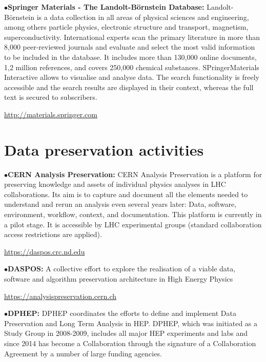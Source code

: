 \item{$\bullet$}{\bf Springer Materials  - The Landolt-B\"ornstein Database:}
Landolt-B\"ornstein is a data collection in all areas of physical sciences and engineering, among others particle physics, electronic structure and transport, magnetism, superconductivity. International experts scan the primary literature in more than 8,000 peer-reviewed journals and evaluate and select the most valid information to be included in the database. It includes more than 130,000 online documents, 1,2 million references, and covers 250,000 chemical substances. SPringerMaterials Interactive allows to visualise and analyse data.
The search functionality is freely accessible and the search results are displayed in their context, whereas the full text is secured to subscribers.
	\item{}\qquad\url{http://materials.springer.com}


\section{Data preservation activities}  %

\medskip


\item{$\bullet$}{\bf CERN Analysis Preservation:} 
CERN Analysis Preservation is a platform for preserving knowledge and assets of individual physics analyses in LHC collaborations. Its aim is to capture and document all the elements needed to understand and rerun an analysis even several years later: Data, software, environment, workflow, context, and documentation. This platform is currently in a pilot stage. It is accessible by LHC experimental groups (standard collaboration access restrictions are applied).
	\item{}\qquad\url{https://daspos.crc.nd.edu}

\medskip

\item{$\bullet$}{\bf DASPOS:} 
A collective effort to explore the realisation of a viable data, software and algorithm preservation architecture in High Energy Physics
	\item{}\qquad\url{https://analysispreservation.cern.ch}


\medskip

\item{$\bullet$}{\bf DPHEP:} 
DPHEP coordinates the efforts to define and implement Data Preservation and Long Term Analysis in HEP. DPHEP, which was initiated as a Study Group in 2008-2009, includes all major HEP experiments and labs and since 2014 has become a Collaboration through the signature of a Collaboration Agreement by a number of large funding agencies. 

